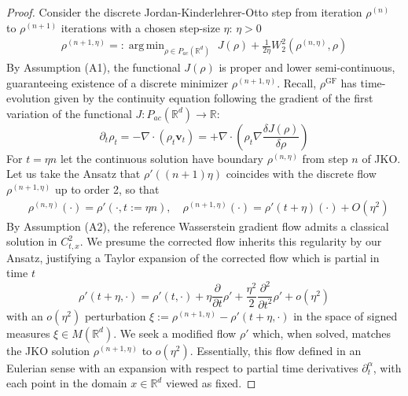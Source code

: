 \documentclass[reqno,11pt,letterpaper]{amsart}
\theoremstyle{plain}
\theoremstyle{definition}
\theoremstyle{remark}
\newcommand{\wass}{\mathrm{GF}}
\DeclareMathOperator*{\argmin}{arg\,min}
\begin{document}

\begin{proof}
Consider the discrete Jordan-Kinderlehrer-Otto step from iteration $\rho^{(n)}$ to $\rho^{(n+1)}$ iterations with a chosen step-size $\eta: \, \eta > 0$
\begin{align*}
\rho^{(n+1,\eta)} =:
\argmin_{\rho \in {P}_{ac}(\mathbb{R}^{d})} \,\, J(\rho) + \frac{1}{2 \eta} W_{2}^{2}(\rho^{(n, \eta)}, \rho)
\end{align*}
By Assumption (A1), the functional $J(\rho)$ is proper and lower semi-continuous, guaranteeing existence of a discrete minimizer $\rho^{(n+1,\eta)}$. Recall, $\rho^{\wass}$ has time-evolution given by the continuity equation following the gradient of the first variation of the functional $J: {P}_{ac}(\mathbb{R}^{d}) \to \mathbb{R}$:
$$
\partial_{t} \rho_{t} = - \nabla \cdot (\rho_{t} \mathbf{v}_{t}) = + \nabla \cdot \left(\rho_{t} \nabla \frac{\delta J (\rho)}{\delta \rho} \right)
$$
For $t = \eta n$ let the continuous solution have boundary $\rho^{(n,\eta)}$ from step $n$ of JKO. Let us take the Ansatz that $\rho'((n+1)\eta)$ coincides with the discrete flow $\rho^{(n+1,\eta)}$ up to order 2, so that
\begin{align*}
    &\rho^{(n,\eta)}(\cdot) = \rho'(\cdot, t:=\eta n), \quad \rho^{(n+1,\eta)}(\cdot) = \rho'(t+\eta)(\cdot) + O(\eta^{2}) 
\end{align*}
By Assumption (A2), the reference Wasserstein gradient flow admits a classical solution in $C^{2}_{t,x}$. We presume the corrected flow inherits this regularity by our Ansatz, justifying a Taylor expansion of the corrected flow which is partial in time $t$ \[\rho'(t+\eta, \cdot) = \rho'(t, \cdot) + \eta \frac{\partial }{\partial t}\rho' + \frac{\eta^{2}}{2} \frac{\partial^{2} }{\partial t^{2}} \rho' + o(\eta^{2})
\] %
with an $o(\eta^{2})$ perturbation $ \xi:=\rho^{(n+1,\eta)} - \rho'(t+\eta, \cdot)$ in the space of signed measures $\xi \in M(\mathbb{R}^{d})$. We seek a modified flow $\rho'$ which, when solved, matches the JKO solution $\rho^{(n+1,\eta)}$ to $o(\eta^{2})$. Essentially, this flow defined in an Eulerian sense with an expansion with respect to partial time derivatives $\partial_{t}^{\alpha}$, with each point in the domain $x\in \mathbb{R}^{d}$ viewed as fixed.


\end{proof}
\end{document}

